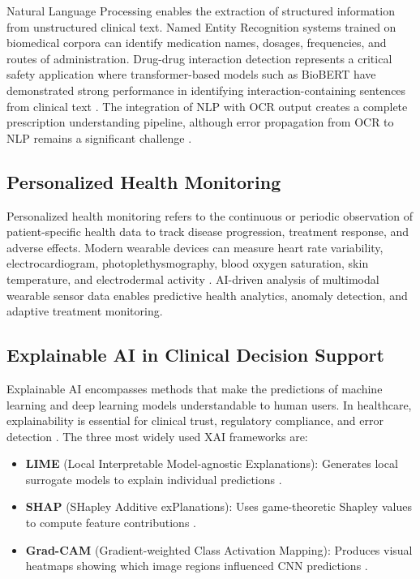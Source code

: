 \documentclass[conference]{IEEEtran}
\begin{document}
Natural Language Processing enables the extraction of structured information from unstructured clinical text. Named Entity Recognition systems trained on biomedical corpora can identify medication names, dosages, frequencies, and routes of administration. Drug-drug interaction detection represents a critical safety application where transformer-based models such as BioBERT have demonstrated strong performance in identifying interaction-containing sentences from clinical text \cite{singaravelu2018prescription}. The integration of NLP with OCR output creates a complete prescription understanding pipeline, although error propagation from OCR to NLP remains a significant challenge \cite{berha2018evaluation}.

\subsection{Personalized Health Monitoring}

Personalized health monitoring refers to the continuous or periodic observation of patient-specific health data to track disease progression, treatment response, and adverse effects. Modern wearable devices can measure heart rate variability, electrocardiogram, photoplethysmography, blood oxygen saturation, skin temperature, and electrodermal activity \cite{talekar2025interpreting}. AI-driven analysis of multimodal wearable sensor data enables predictive health analytics, anomaly detection, and adaptive treatment monitoring.

\subsection{Explainable AI in Clinical Decision Support}

Explainable AI encompasses methods that make the predictions of machine learning and deep learning models understandable to human users. In healthcare, explainability is essential for clinical trust, regulatory compliance, and error detection \cite{nguyen2021evaluation}. The three most widely used XAI frameworks are:

\begin{itemize}
    \item \textbf{LIME} (Local Interpretable Model-agnostic Explanations): Generates local surrogate models to explain individual predictions \cite{gifu2022aibacked,talekar2025interpreting}.
    \item \textbf{SHAP} (SHapley Additive exPlanations): Uses game-theoretic Shapley values to compute feature contributions \cite{gifu2022aibacked,berha2018evaluation}.
    \item \textbf{Grad-CAM} (Gradient-weighted Class Activation Mapping): Produces visual heatmaps showing which image regions influenced CNN predictions \cite{berha2018evaluation,devi2026endtoend}.
\end{itemize}
\end{document}
